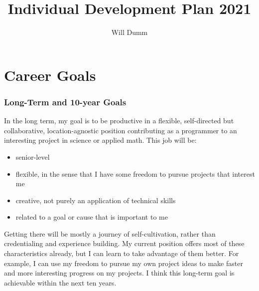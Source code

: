 \documentclass{paper}
\title{Individual Development Plan 2021}
\author{Will Dumm}
\begin{document}
\maketitle



\section*{Career Goals}

\subsubsection*{Long-Term and 10-year Goals}
In the long term, my goal is to be productive in a flexible, self-directed but collaborative, location-agnostic position contributing as a programmer to an interesting project in science or applied math.
This job will be:
\begin{itemize}
    \item senior-level
    \item flexible, in the sense that I have some freedom to pursue projects that interest me
    \item creative, not purely an application of technical skills
    \item related to a goal or cause that is important to me
\end{itemize}
Getting there will be mostly a journey of self-cultivation, rather than credentialing and experience building.
My current position offers most of these characteristics already, but I can learn to take advantage of them better. For example, I can use my freedom to pursue my own project ideas to make faster and more interesting progress on my projects.
I think this long-term goal is achievable within the next ten years.
\end{document}
